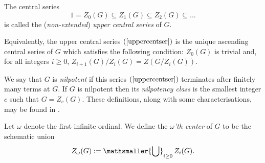 \documentclass[twoside,a4paper,reqno,11pt]{amsart}
\theoremstyle{definition}
\begin{document}
\vspace{2mm}\noindent The central series \begin{equation}\label{uppercentser} 1=Z_0(G)\subseteq Z_1(G)\subseteq Z_2(G)\subseteq ... \end{equation} is called the (\textit{non-extended}) \textit{upper central series} of $G$. %

\vspace{2mm}\noindent Equivalently, the upper central series $(\ref{uppercentser})$ is the unique ascending central series of $G$ which satisfies the following condition: $Z_0(G)$ is trivial and, for all integers $i\geq 0$, $Z_{i+1}(G)/Z_i(G)=Z(G/Z_i(G))$.

\vspace{2mm}\noindent We say that $G$ is \textit{nilpotent} if this series $(\ref{uppercentser})$ terminates after finitely many terms at $G$. If $G$ is nilpotent then its \textit{nilpotency class} is the smallest integer $c$ such that $G=Z_c(G)$. These definitions, along with some characterisations, may be found in \cite[VIB, Def.\ 8.2.1, Prop.\ 8.2]{SGA3}. %

\vspace{2mm}\noindent Let $\omega$ denote the first infinite ordinal. %
We define the \textit{$\omega$'th center} of $G$ to be the schematic union \begin{equation}\label{omegacenterdef} Z_\omega(G):=\mathsmaller{\bigcup}_{i\geq 0}\,Z_i(G).\end{equation}
\end{document}
